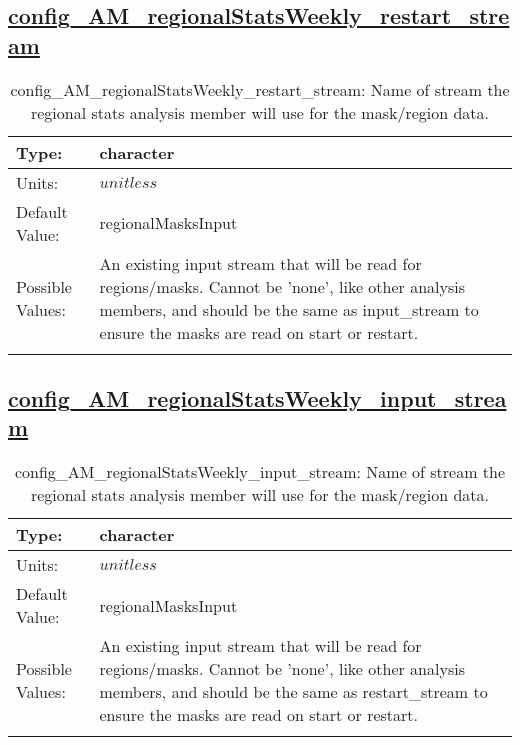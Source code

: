 \subsection[config\_AM\_regionalStatsWeekly\_restart\_stream]{\hyperref[sec:nm_tab_AM_regionalStatsWeekly]{config\_AM\_regionalStatsWeekly\_restart\_stream}}
\label{subsec:nm_sec_config_AM_regionalStatsWeekly_restart_stream}
\begin{center}
\begin{longtable}{| p{2.0in} || p{4.0in} |}
    \hline
    Type: & character \\
    \hline
    Units: & $unitless$ \\
    \hline
    Default Value: & regionalMasksInput \\
    \hline
    Possible Values: & An existing input stream that will be read for regions/masks. Cannot be 'none', like other analysis members, and should be the same as input\_stream to ensure the masks are read on start or restart. \\
    \hline
    \caption{config\_AM\_regionalStatsWeekly\_restart\_stream: Name of stream the regional stats analysis member will use for the mask/region data.}
\end{longtable}
\end{center}
\subsection[config\_AM\_regionalStatsWeekly\_input\_stream]{\hyperref[sec:nm_tab_AM_regionalStatsWeekly]{config\_AM\_regionalStatsWeekly\_input\_stream}}
\label{subsec:nm_sec_config_AM_regionalStatsWeekly_input_stream}
\begin{center}
\begin{longtable}{| p{2.0in} || p{4.0in} |}
    \hline
    Type: & character \\
    \hline
    Units: & $unitless$ \\
    \hline
    Default Value: & regionalMasksInput \\
    \hline
    Possible Values: & An existing input stream that will be read for regions/masks. Cannot be 'none', like other analysis members, and should be the same as restart\_stream to ensure the masks are read on start or restart. \\
    \hline
    \caption{config\_AM\_regionalStatsWeekly\_input\_stream: Name of stream the regional stats analysis member will use for the mask/region data.}
\end{longtable}
\end{center}
